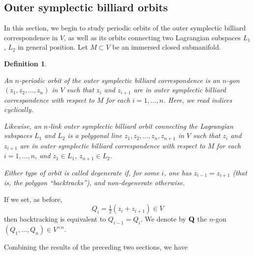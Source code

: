 \documentclass[12pt]{article}
\newtheorem{remark}[lemma]{Remark}
\newtheorem{definition}[lemma]{Definition}
\newcommand{\R}{{\mathbb R}}
\begin{document}

\subsection{Outer symplectic billiard  orbits} \label{subsect:per}


In this section, we begin to study periodic orbits of the outer symplectic billiard correspondence in $V$, as well as its orbits connecting two Lagrangian subspaces $L_1$, $L_2$ in general position. Let $M \subset V$ be an immersed closed submanifold. 

\begin{definition}\label{def:periodic_orbit_and_degenerate}
{\rm An $n$-periodic orbit of the outer symplectic billiard correspondence is an $n$-gon $(z_1,z_2,\ldots,z_n)$ in $V$ such that $z_i$ and $z_{i+1}$ are in outer symplectic billiard correspondence with respect to $M$ for each $i=1,\ldots, n$. Here, we read indices cyclically.

Likewise, an $n$-link outer symplectic billiard orbit connecting the Lagrangian subspaces $L_1$ and $L_2$ is a polygonal line  $z_1,z_2,\ldots,z_n,z_{n+1}$ in $V$ such that $z_i$ and $z_{i+1}$ are in outer symplectic billiard correspondence with respect to $M$ for each $i=1,\ldots, n$, and $z_1 \in L_1$, $z_{n+1} \in L_2$. 

Either type of orbit is called degenerate if, for some $i$, one has $z_{i-1}=z_{i+1}$ (that is, the polygon ``backtracks''), and non-degenerate otherwise.}
\end{definition}

If we set, as before,
\begin{equation} \label{eq:midpt}
Q_i = \tfrac12 (z_i + z_{i+1})\in V
\end{equation}
then backtracking is equivalent to $Q_{i-1}=Q_i$. We denote by ${\bf Q}$ the $n$-gon $(Q_1,\ldots,Q_n)\in V^{\times n}$.

Combining the results of the preceding two sections, we have
\end{document}
